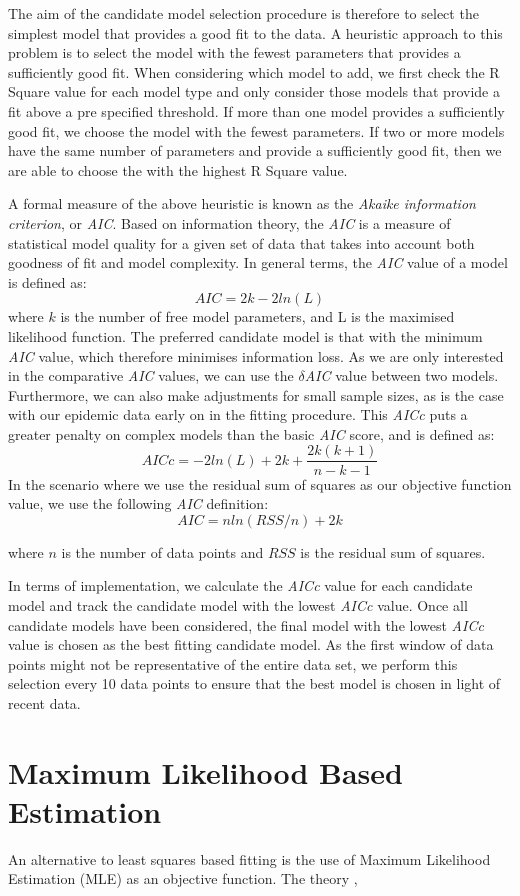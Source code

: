 The aim of the candidate model selection procedure is therefore to
select the simplest model that provides a good fit to the data. A
heuristic approach to this problem is to select the model with the
fewest parameters that provides a sufficiently good fit. When
considering which model to add, we first check the R Square value for
each model type and only consider those models that provide a fit
above a pre specified threshold. If more than one model provides a
sufficiently good fit, we choose the model with the fewest
parameters. If two or more models have the same number of parameters
and provide a sufficiently good fit, then we are able to choose the
with the highest R Square value. 

A formal measure of the above heuristic is known as the \emph{Akaike
  information criterion}, or \emph{AIC}.\cite{burnham} Based on information theory, the \emph{AIC} is a measure
of statistical model quality for a given set of data that takes into
account both goodness of fit and model complexity. In general terms, the \emph{AIC}
value of a model is defined as:
\begin{equation}
AIC = 2k - 2ln(L)
\end{equation}
where $k$ is the number of free model parameters, and L is the maximised
likelihood function. The preferred candidate model is that with the
minimum \emph{AIC} value, which therefore minimises information loss. As we are only interested in the comparative
\emph{AIC} values, we can use the $\delta$\emph{AIC} value between two
models. Furthermore, we can also make adjustments for small sample
sizes, as is the case with our epidemic data early on in the fitting
procedure. This \emph{AICc} puts a greater penalty on complex models
than the basic \emph{AIC} score, and is defined as:
\begin{equation}
AICc = -2ln(L) + 2k + \frac{2k(k+1)}{n - k - 1}
\end{equation}
In the scenario where we use the residual sum of squares as our
objective function value, we use the following \emph{AIC} definition:
\begin{equation}
AIC = nln(RSS/n) + 2k
\end{equation}

where $n$ is the number of data points and $RSS$ is the residual sum
of squares.

In terms of implementation, we calculate the \emph{AICc} value for
each candidate model and track the candidate model with the lowest
\emph{AICc} value. Once all candidate models have been considered, the
final model with the lowest \emph{AICc} value is chosen as the best
fitting candidate model. As the first window of data points might not
be representative of the entire data set, we perform this selection
every 10 data points to ensure that the best model is chosen in light
of recent data. 

\section{Maximum Likelihood Based Estimation}
An alternative to least squares based fitting is the use of Maximum
Likelihood Estimation (MLE) as an objective function. The theory  ,
